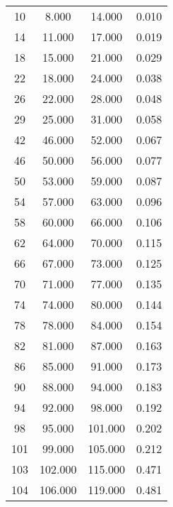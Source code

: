 % 
\begin{tabular}{cccc}
  \hline
  \hline
10 & 8.000 & 14.000 & 0.010 \\ 
  14 & 11.000 & 17.000 & 0.019 \\ 
  18 & 15.000 & 21.000 & 0.029 \\ 
  22 & 18.000 & 24.000 & 0.038 \\ 
  26 & 22.000 & 28.000 & 0.048 \\ 
  29 & 25.000 & 31.000 & 0.058 \\ 
  42 & 46.000 & 52.000 & 0.067 \\ 
  46 & 50.000 & 56.000 & 0.077 \\ 
  50 & 53.000 & 59.000 & 0.087 \\ 
  54 & 57.000 & 63.000 & 0.096 \\ 
  58 & 60.000 & 66.000 & 0.106 \\ 
  62 & 64.000 & 70.000 & 0.115 \\ 
  66 & 67.000 & 73.000 & 0.125 \\ 
  70 & 71.000 & 77.000 & 0.135 \\ 
  74 & 74.000 & 80.000 & 0.144 \\ 
  78 & 78.000 & 84.000 & 0.154 \\ 
  82 & 81.000 & 87.000 & 0.163 \\ 
  86 & 85.000 & 91.000 & 0.173 \\ 
  90 & 88.000 & 94.000 & 0.183 \\ 
  94 & 92.000 & 98.000 & 0.192 \\ 
  98 & 95.000 & 101.000 & 0.202 \\ 
  101 & 99.000 & 105.000 & 0.212 \\ 
  103 & 102.000 & 115.000 & 0.471 \\ 
  104 & 106.000 & 119.000 & 0.481 \\ 
   \hline
\end{tabular}
